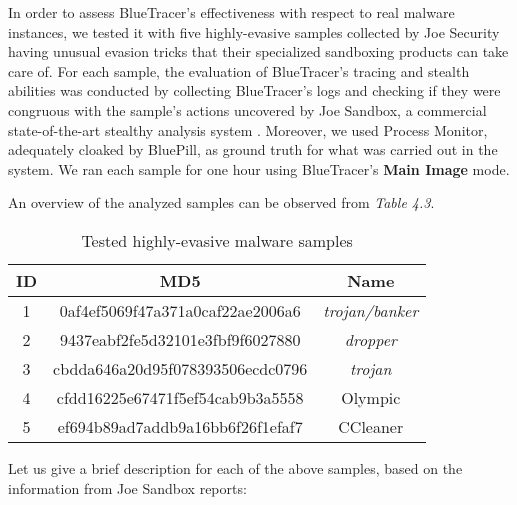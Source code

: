 In order to assess BlueTracer's effectiveness with respect to real malware instances, we tested it with five highly-evasive samples collected by Joe Security \cite{JoeBox} having unusual evasion tricks that their specialized sandboxing products can take care of. For each sample, the evaluation of BlueTracer's tracing and stealth abilities was conducted by collecting BlueTracer's logs and checking if they were congruous with the sample's actions uncovered by Joe Sandbox, a commercial state-of-the-art stealthy analysis system \cite{JoeSandbox}. Moreover, we used Process Monitor, adequately cloaked by BluePill, as ground truth for what was carried out in the system.
We ran each sample for one hour using BlueTracer's \textbf{Main Image} mode.

An overview of the analyzed samples can be observed from \textit{Table 4.3}.


\begin{table}[h]
\vspace*{0.5cm}
\begin{center}
 \begin{tabular}{||c c c||} 
 \hline
 \textbf{ID} & \textbf{MD5} & \textbf{Name} \\ [0.5ex] 
 \hline\hline
 1 & 0af4ef5069f47a371a0caf22ae2006a6 & \textit{trojan/banker} \\ 
 \hline
 2 & 9437eabf2fe5d32101e3fbf9f6027880 & \textit{dropper} \\
 \hline
 3 & cbdda646a20d95f078393506ecdc0796 & \textit{trojan}\\
 \hline
 4 & cfdd16225e67471f5ef54cab9b3a5558 & Olympic\\
 \hline
 5 & ef694b89ad7addb9a16bb6f26f1efaf7 & CCleaner\\ [1ex] 
 \hline
\end{tabular}
\end{center}
\caption{Tested highly-evasive malware samples}
\end{table}

Let us give a brief description for each of the above samples, based on the information from Joe Sandbox reports:

